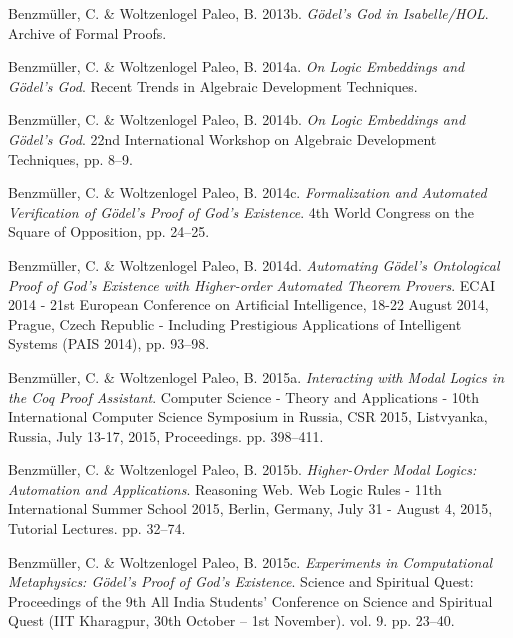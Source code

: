 \documentclass[smallextended]{svjour3}
\begin{document}
\begin{thebibliography}{9}
Benzm\"uller, C. \& Woltzenlogel Paleo, B. 2013b. {\itshape G{\"{o}}del's God in Isabelle/HOL}. Archive of Formal Proofs. 

Benzm\"uller, C. \& Woltzenlogel Paleo, B. 2014a. {\itshape On Logic Embeddings and G\"odel's God}. Recent Trends in Algebraic Development Techniques. 

Benzm\"uller, C. \& Woltzenlogel Paleo, B. 2014b. {\itshape On Logic Embeddings and G\"odel's God}. 22nd International Workshop on Algebraic Development Techniques, pp. 8--9. 


Benzm\"uller, C. \& Woltzenlogel Paleo, B. 2014c. {\itshape Formalization and Automated Verification of G\"odel's Proof of God's Existence}. 4th World Congress on the Square of Opposition, pp. 24--25. 

Benzm\"uller, C. \& Woltzenlogel Paleo, B. 2014d. {\itshape Automating G{\"{o}}del's Ontological Proof of God's Existence with Higher-order Automated Theorem Provers}. ECAI 2014 - 21st European Conference on Artificial Intelligence, 18-22 August 2014, Prague, Czech Republic - Including Prestigious Applications of Intelligent Systems (PAIS 2014), pp. 93--98. 

Benzm\"uller, C. \& Woltzenlogel Paleo, B. 2015a. {\itshape Interacting with Modal Logics in the Coq Proof Assistant}. Computer Science - Theory and Applications - 10th International Computer Science Symposium in Russia, {CSR} 2015, Listvyanka, Russia, July   13-17, 2015, Proceedings. pp. 398--411. 

Benzm\"uller, C. \& Woltzenlogel Paleo, B. 2015b. {\itshape Higher-Order Modal Logics: Automation and Applications}. Reasoning Web. Web Logic Rules - 11th International Summer School 2015, Berlin, Germany, July 31 - August 4, 2015, Tutorial Lectures. pp. 32--74. 

Benzm\"uller, C. \& Woltzenlogel Paleo, B. 2015c. {\itshape Experiments in Computational Metaphysics: G\"odel's Proof of God's Existence}. Science and Spiritual Quest: Proceedings of the 9th All India Students' Conference on Science and Spiritual Quest (IIT Kharagpur, 30th October -- 1st November). vol. 9. pp. 23--40. 


\end{thebibliography}
\end{document}
